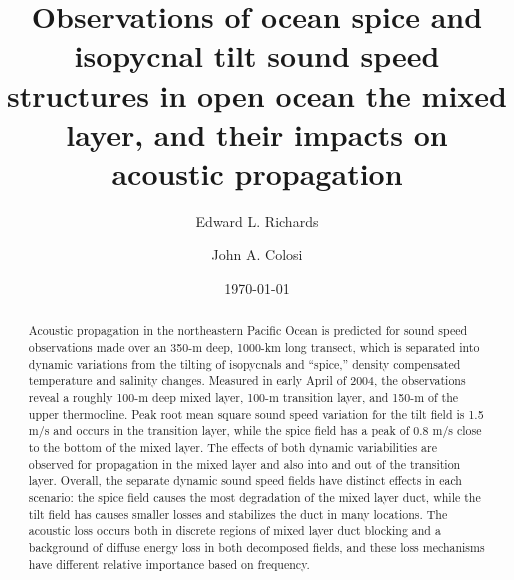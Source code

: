 \documentclass[preprint,NumberedRefs]{JASA}
\begin{document}
\title[Mixed layer tilt and spice]{Observations of ocean spice and isopycnal tilt sound speed structures in open ocean the mixed layer, and their impacts on acoustic propagation}
\author{Edward L. Richards}
\author{John A. Colosi}


\date{\today}

\begin{abstract}
Acoustic propagation in the northeastern Pacific Ocean is predicted for sound speed observations made over an 350-m deep, 1000-km long transect, which is separated into dynamic variations from the tilting of isopycnals and “spice,” density compensated temperature and salinity changes. Measured in early April of 2004, the observations reveal a roughly 100-m deep mixed layer, 100-m transition layer, and 150-m of the upper thermocline. Peak root mean square sound speed variation for the tilt field is 1.5 m/s and occurs in the transition layer, while the spice field has a peak of 0.8 m/s close to the bottom of the mixed layer. The effects of both dynamic variabilities are observed for propagation in the mixed layer and also into and out of the transition layer. Overall, the separate dynamic sound speed fields have distinct effects in each scenario: the spice field causes the most degradation of the mixed layer duct, while the tilt field has causes smaller losses and stabilizes the duct in many locations. The acoustic loss occurs both in discrete regions of mixed layer duct blocking and a background of diffuse energy loss in both decomposed fields, and these loss mechanisms have different relative importance based on frequency.
\end{abstract}

\maketitle
\end{document}
